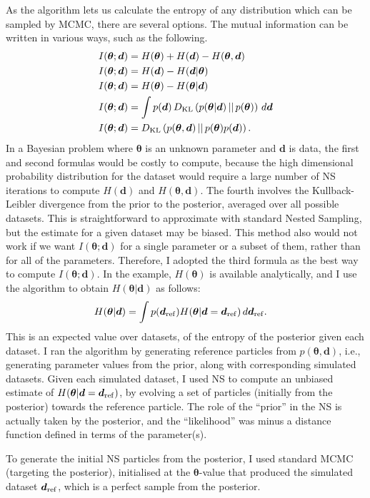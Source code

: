 \documentclass[entropy,article,accept,oneauthor,pdftex,10pt,a4paper]{mdpi}
\renewcommand{\d}{\boldsymbol{d}}
\newcommand{\x}{\boldsymbol{\theta}}
\begin{document}
As the algorithm lets us calculate the entropy of any distribution which can
be sampled by MCMC, there are several options. The mutual information
can be written in various ways, such as the following.
\begin{align}
I(\x; \d) &= H(\x) + H(\d) - H(\x, \d) \\
I(\x; \d) &= H(\d) - H(\d|\x) \\
I(\x; \d) &= H(\x) - H(\x|\d) \\
I(\x; \d) &= \int p(\d) \, D_{\rm KL}\left(p(\x|\d) \,||\, p(\x)\right) \, d\d\\
I(\x; \d) &= D_{\rm KL}\left(p(\x, \d) \,||\, p(\x)p(\d)\right).
\end{align}
In a Bayesian problem where $\x$ is an unknown parameter and $\d$ is data, the
first and second formulas would be costly to compute, because the
high dimensional probability distribution for the dataset would require a
large number of NS iterations to compute $H(\d)$ and $H(\x, \d)$.
The fourth involves the Kullback-Leibler divergence from the prior to the
posterior, averaged over all possible datasets. This is straightforward to
approximate with standard Nested Sampling, but the estimate for a given dataset
may be biased. This method also would not work if we want $I(\x; \d)$ for
a single parameter or a subset of them, rather than for all of the parameters.
Therefore, I adopted the third formula as the best way to compute $I(\x; \d)$.
In the example, $H(\x)$ is available analytically, and I use the algorithm to
obtain $H(\x | \d)$ as follows:
\begin{align}
H(\x | \d) &= \int p(\d_{\rm ref}) H(\x | \d=\d_{\rm ref}) \, d\d_{\rm ref}.
\end{align}
This is an expected value over datasets, of the entropy of the posterior given
each dataset. I ran the algorithm by generating reference particles from
$p(\x, \d)$, i.e., generating parameter values from the prior, along with
corresponding simulated datasets. Given each simulated dataset, I used NS
to compute an unbiased estimate of $H(\x | \d=\d_{\rm ref})$, by evolving
a set of particles (initially from the posterior) towards the reference particle.
The role of the ``prior'' in the NS is actually taken by the posterior, and the
``likelihood'' was minus a distance function defined in terms of the
parameter(s).

To generate the initial
NS particles from the posterior, I used standard MCMC (targeting the
posterior), initialised at the $\x$-value that produced the simulated dataset
$\d_{\rm ref}$, which is a perfect sample from the posterior.
\end{document}
